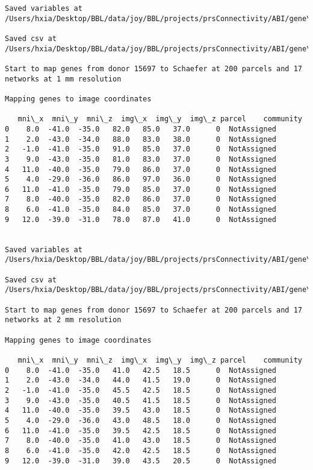 \documentclass[11pt]{article}
\begin{document}
\begin{Verbatim}[commandchars=\\\{\}]
Saved variables at /Users/hxia/Desktop/BBL/data/joy/BBL/projects/prsConnectivity/ABI/gene\_mapping/15697donor\_200Parcels\_7Network\_2mm.pkl

Saved csv at /Users/hxia/Desktop/BBL/data/joy/BBL/projects/prsConnectivity/ABI/gene\_mapping/15697donor\_200Parcels\_7Network\_2mm.csv

Start to map genes from donor 15697 to Schaefer at 200 parcels and 17 networks at 1 mm resolution

Mapping genes to image coordinates

   mni\_x  mni\_y  mni\_z  img\_x  img\_y  img\_z parcel    community
0    8.0  -41.0  -35.0   82.0   85.0   37.0      0  NotAssigned
1    2.0  -43.0  -34.0   88.0   83.0   38.0      0  NotAssigned
2   -1.0  -41.0  -35.0   91.0   85.0   37.0      0  NotAssigned
3    9.0  -43.0  -35.0   81.0   83.0   37.0      0  NotAssigned
4   11.0  -40.0  -35.0   79.0   86.0   37.0      0  NotAssigned
5    4.0  -29.0  -36.0   86.0   97.0   36.0      0  NotAssigned
6   11.0  -41.0  -35.0   79.0   85.0   37.0      0  NotAssigned
7    8.0  -40.0  -35.0   82.0   86.0   37.0      0  NotAssigned
8    6.0  -41.0  -35.0   84.0   85.0   37.0      0  NotAssigned
9   12.0  -39.0  -31.0   78.0   87.0   41.0      0  NotAssigned


Saved variables at /Users/hxia/Desktop/BBL/data/joy/BBL/projects/prsConnectivity/ABI/gene\_mapping/15697donor\_200Parcels\_17Network\_1mm.pkl

Saved csv at /Users/hxia/Desktop/BBL/data/joy/BBL/projects/prsConnectivity/ABI/gene\_mapping/15697donor\_200Parcels\_17Network\_1mm.csv

Start to map genes from donor 15697 to Schaefer at 200 parcels and 17 networks at 2 mm resolution

Mapping genes to image coordinates

   mni\_x  mni\_y  mni\_z  img\_x  img\_y  img\_z parcel    community
0    8.0  -41.0  -35.0   41.0   42.5   18.5      0  NotAssigned
1    2.0  -43.0  -34.0   44.0   41.5   19.0      0  NotAssigned
2   -1.0  -41.0  -35.0   45.5   42.5   18.5      0  NotAssigned
3    9.0  -43.0  -35.0   40.5   41.5   18.5      0  NotAssigned
4   11.0  -40.0  -35.0   39.5   43.0   18.5      0  NotAssigned
5    4.0  -29.0  -36.0   43.0   48.5   18.0      0  NotAssigned
6   11.0  -41.0  -35.0   39.5   42.5   18.5      0  NotAssigned
7    8.0  -40.0  -35.0   41.0   43.0   18.5      0  NotAssigned
8    6.0  -41.0  -35.0   42.0   42.5   18.5      0  NotAssigned
9   12.0  -39.0  -31.0   39.0   43.5   20.5      0  NotAssigned



\end{Verbatim}
\end{document}
